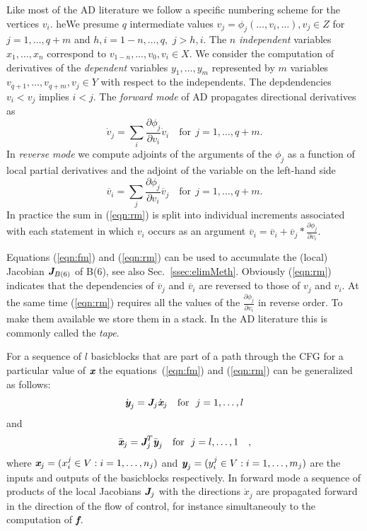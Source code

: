 \documentclass[11pt]{article}
\newcommand{\basicblock}{basicblock}
\newcommand{\bmf}{\mbox{\bf\em f}}
\newcommand{\bmJ}{\mbox{\bf\em J}}
\newcommand{\bmx}{\mbox{\bf\em x}}
\newcommand{\bmy}{\mbox{\bf\em y}}
\newcommand{\refsec}[1]{{Sec.~\ref{#1}}}
\newcommand{\refeqn}[1]{{(\ref{#1})}}
\begin{document}
Like most of the AD literature we follow a specific numbering scheme for the vertices $v_i$.
heWe presume $q$ intermediate values
$v_j = \phi_j(\ldots,v_i,\ldots), v_j\in Z$
for $j=1,\ldots,q+m$ and $h,i=1-n,\ldots,q,$ $j>h,i$. 
The $n$ {\em independent}
variables $x_1,\ldots,x_n$ correspond to 
$v_{1-n},\ldots,v_0, v_i\in X$. 
We consider the 
computation of derivatives of the {\em dependent} variables 
$y_1,\ldots,y_m$ represented by $m$ variables $v_{q+1},\ldots,v_{q+m}, v_j\in Y$
with respect to the independents. The depdendencies $v_i<v_j$ implies $i<j$. 
The {\em forward mode} of AD propagates directional derivatives
as 
\begin{equation} \label{eqn:fm}
\dot{v}_j= \sum\limits_i\frac{\partial \phi_j}{\partial v_i}\dot{v}_i 
\quad \text{for}~~j=1,\ldots,q+m.
\end{equation} 
In {\em reverse mode} we compute adjoints of the arguments of the $\phi_j$
as a function of local partial derivatives and the 
adjoint of the variable on the left-hand side
\begin{equation} \label{eqn:rm}
\overline{v}_i= \sum\limits_j\frac{\partial \phi_j}{\partial v_i}\overline{v}_j 
\quad \text{for}~~j=1,\ldots,q+m.
\end{equation} 
In practice the sum in \refeqn{eqn:rm} is split into individual increments 
associated with each statement in which $v_i$ occurs as an argument 
$\overline{v}_i=\overline{v}_i+\overline{v}_j * \frac{\partial \phi_j}{\partial v_i}$.

Equations \refeqn{eqn:fm} and \refeqn{eqn:rm} can be used to accumulate 
the (local) Jacobian $\bmJ_{B(6)}$
of B(6), see also \refsec{ssec:elimMeth}. 
Obviously \refeqn{eqn:rm}  indicates that the dependencies of $\overline{v}_j$ and 
$\overline{v}_i$ are reversed to those of $v_j$ and $v_i$. At the same time \refeqn{eqn:rm}
requires all the values of the $\frac{\partial \phi_j}{\partial v_i}$ in reverse order. To make them 
available we store them in a stack. In the  AD literature this is commonly called the {\em tape}. 


For a sequence of $l$ {\basicblock}s that are part of 
a path through the CFG for a particular value of $\bmx$ the 
equations~(\ref{eqn:fm}) and (\ref{eqn:rm}) can be generalized as follows:
\begin{equation} \label{eqn:bbfm}
\dot{\bmy}_j=\bmJ_j \dot{\bmx}_j \quad \text{for}~~j=1,\ldots,l
\end{equation} 
and 
\begin{equation} \label{eqn:bbrm}
\bar{\bmx}_j=\bmJ^T_j \bar{\bmy}_j \quad \text{for}~~j=l,\ldots,1\quad ,
\end{equation} 
where $\bmx_j = (x^j_i \in V :  i=1,\ldots,n_j)$ and
$\bmy_j = (y^j_i \in V : i=1,\ldots,m_j)$ are the inputs and outputs of the 
{\basicblock}s
respectively. 
In forward mode a sequence of 
products of the local Jacobians $\bmJ_j$ 
with the directions $\dot{x}_j$ 
are propagated forward in the direction of the flow of control, for 
instance simultaneouly to the computation of $\bmf$.
 
\end{document}
